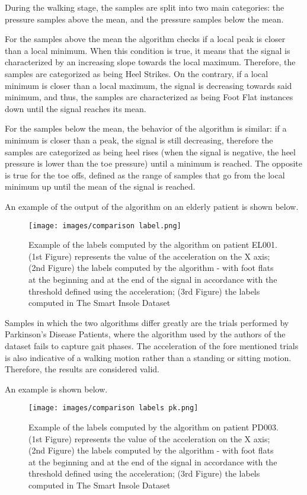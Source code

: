 During the walking stage, the samples are split into two main categories: the pressure samples above the mean, and the pressure samples below the mean. 

For the samples above the mean the algorithm checks if a local peak is closer than a local minimum. When this condition is true, it means that the signal is characterized by an increasing slope towards the local maximum. Therefore, the samples are categorized as being Heel Strikes. On the contrary, if a local minimum is closer than a local maximum, the signal is decreasing towards said minimum, and thus, the samples are characterized as being Foot Flat instances down until the signal reaches its mean.

For the samples below the mean, the behavior of the algorithm is similar: if a minimum is closer than a peak, the signal is still decreasing, therefore the samples are categorized as being heel rises (when the signal is negative, the heel pressure is lower than the toe pressure) until a minimum is reached. The opposite is true for the toe offs, defined as the range of samples that go from the local minimum up until the mean of the signal is reached.

An example of the output of the algorithm on an elderly patient is shown below.


\begin{figure}[h!]
    \centering
    \texttt{[image: images/comparison label.png]}
    \caption{Example of the labels computed by the algorithm on patient EL001. (1st Figure) represents the value of the acceleration on the X axis; (2nd Figure) the labels computed by the algorithm - with foot flats at the beginning and at the end of the signal in accordance with the threshold defined using the acceleration; (3rd Figure) the labels computed in The Smart Insole Dataset}
    \label{fig:Example of the labels computed by the algorithm on patient EL001.}
\end{figure}

Samples in which the two algorithms differ greatly are the trials performed by Parkinson's Disease Patients, where the algorithm used by the authors of the dataset fails to capture gait phases. The acceleration of the fore mentioned trials is also indicative of a walking motion rather than a standing or sitting motion. Therefore, the results are considered valid.

An example is shown below.

\begin{figure}[h!]
    \centering
    \texttt{[image: images/comparison labels pk.png]}
    \caption{Example of the labels computed by the algorithm on patient PD003. (1st Figure) represents the value of the acceleration on the X axis; (2nd Figure) the labels computed by the algorithm - with foot flats at the beginning and at the end of the signal in accordance with the threshold defined using the acceleration; (3rd Figure) the labels computed in The Smart Insole Dataset}
    \label{fig:Example of the labels computed by the algorithm on patient PD003.}
\end{figure}



